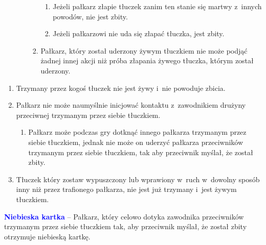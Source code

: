\documentclass[12pt,a4paper]{article}
\renewcommand{\subsubsection}[1]{
  \oldsubsubsection{#1}%
  \leftskip1.5cm
}
\newcommand\bluecard[1]{\bgroup\textcolor{blue}{\textbf{#1}}}
\begin{document}
\begin{enumerate}
\begin{enumerate}
\begin{enumerate}
			                  \begin{enumerate}
				                  \item
				                        Jeżeli pałkarz złapie tłuczek zanim ten stanie się martwy z~innych powodów, nie jest zbity.
				                  \item
				                        Jeżeli pałkarzowi nie uda się złapać tłuczka, jest zbity.
			                  \end{enumerate}
			            \item
			                  Pałkarz, który został uderzony żywym tłuczkiem nie może podjąć
			                  żadnej innej akcji niż próba złapania żywego tłuczka, którym
			                  został uderzony.
		            \end{enumerate}
	      \end{enumerate}
\end{enumerate}

\subsubsection{Dotykanie tłuczkiem}

\begin{enumerate}
	\item
	      Trzymany przez kogoś tłuczek nie jest żywy i~nie powoduje zbicia.
	\item
	      Pałkarz nie może naumyślnie inicjować kontaktu z~zawodnikiem drużyny
	      przeciwnej trzymanym przez siebie tłuczkiem.

	      \begin{enumerate}
		      \item
		            Pałkarz może podczas gry dotknąć innego pałkarza trzymanym przez
		            siebie tłuczkiem, jednak nie może on uderzyć pałkarza przeciwników
		            trzymanym przez siebie tłuczkiem, tak aby przeciwnik myślał, że
		            został zbity.
	      \end{enumerate}
	\item
	      Tłuczek który zostaw wypuszczony lub wprawiony w~ruch w~dowolny sposób
	      inny niż przez trafionego pałkarza, nie jest już trzymany i~jest żywym
	      tłuczkiem.
\end{enumerate}

\bluecard{Niebieska kartka} -- Pałkarz, który celowo dotyka zawodnika
przeciwników trzymanym przez siebie tłuczkiem tak, aby przeciwnik
myślał, że został zbity otrzymuje niebieską kartkę.
\end{document}
